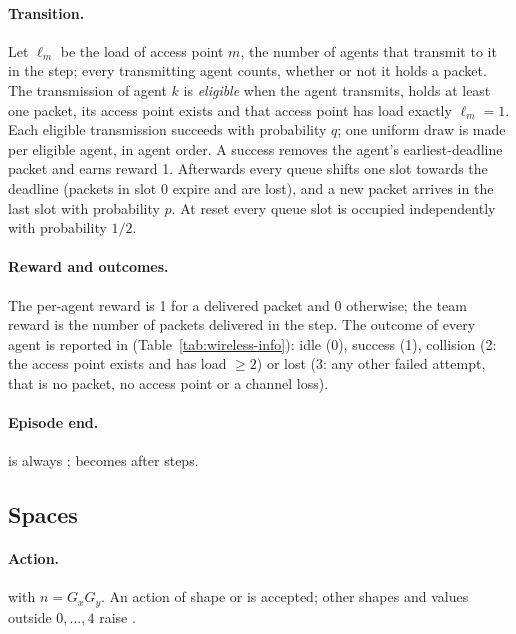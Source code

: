 \paragraph{Transition.} Let $\ell_m$ be the load of access point $m$, the
number of agents that transmit to it in the step; every transmitting agent
counts, whether or not it holds a packet. The transmission of agent $k$ is
\emph{eligible} when the agent transmits, holds at least one packet, its access
point exists and that access point has load exactly $\ell_m = 1$. Each eligible
transmission succeeds with probability $q$; one uniform draw is made per
eligible agent, in agent order. A success removes the agent's earliest-deadline
packet and earns reward 1. Afterwards every queue shifts one slot towards the
deadline (packets in slot 0 expire and are lost), and a new packet arrives in
the last slot with probability $p$. At reset every queue slot is occupied
independently with probability $1/2$.

\paragraph{Reward and outcomes.} The per-agent reward is 1 for a delivered
packet and 0 otherwise; the team reward is the number of packets delivered in
the step. The outcome of every agent is reported in 
(Table~\ref{tab:wireless-info}): idle (0), success (1), collision (2: the
access point exists and has load $\ge 2$) or lost (3: any other failed attempt,
that is no packet, no access point or a channel loss).

\paragraph{Episode end.}  is always ;
 becomes  after  steps.

\subsection{Spaces}\label{sec:wireless-spaces}

\paragraph{Action.}  with $n = G_x G_y$. An action
of shape  or  is accepted; other shapes and
values outside $0, \dots, 4$ raise .

